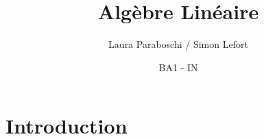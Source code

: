 \documentclass{article}
\title{Algèbre Linéaire}
\author{Laura Paraboschi / Simon Lefort }
\date{BA1 - IN}
\begin{document}
\maketitle

\section{Introduction}
\end{document}
